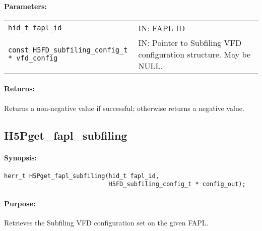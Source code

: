 \documentclass[../main.tex]{subfiles}
\begin{document}
\paragraph{Parameters:}
\begin{flushleft}%
 \begin{tabular}{lp{}}%
   \texttt{hid\_t fapl\_id} & IN: \Gls{FAPL} ID \\
   \texttt{const H5FD\_subfiling\_config\_t * vfd\_config} & IN: Pointer to Subfiling VFD configuration structure. May be NULL. \\
 \end{tabular}%
\end{flushleft}%

\paragraph{Returns:}
\begin{flushleft}%
Returns a non-negative value if successful; otherwise returns a negative value.
\end{flushleft}%

\newpage

\subsection{H5Pget\_fapl\_subfiling}
\label{ref:h5p_get_fapl_subfiling}

\paragraph{Synopsis:}
\begin{flushleft}%
\begin{verbatim}
herr_t H5Pget_fapl_subfiling(hid_t fapl_id,
                             H5FD_subfiling_config_t * config_out);
\end{verbatim}
\end{flushleft}%

\paragraph{Purpose:}
\begin{flushleft}%
Retrieves the Subfiling \Gls{VFD} configuration set on the given \Gls{FAPL}.
\end{flushleft}%
\end{document}
